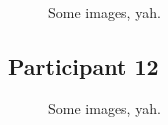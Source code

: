 \lipsum[1]

\clearpage

\begin{figure}[h]
	\caption{Some images, yah.}
\end{figure}

\lipsum[1]


\clearpage

\subsection{Participant 12}

\begin{figure}[h]
	\caption{Some images, yah.}
\end{figure}


